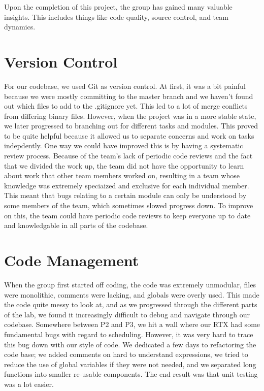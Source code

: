\documentclass[12pt]{report}
\begin{document}
Upon the completion of this project, the group has gained many valuable insights. This includes things like code quality, source control, and team dynamics.

\section{Version Control}
For our codebase, we used Git as version control. At first, it was a bit painful because we were mostly committing to the master branch and we haven't found out which files to add to the .gitignore yet. This led to a lot of merge conflicts from differing binary files.
However, when the project was in a more stable state, we later progressed to branching out for different tasks and modules. This proved to be quite helpful because it allowed us to separate concerns and work on tasks indepdently.
One way we could have improved this is by having a systematic review process. Because of the team's lack of periodic code reviews and the fact that we divided the work up, the team did not have the opportunity to learn about work that other team members worked on, resulting in a team whose knowledge was extremely speciaized and exclusive for each individual member. This meant that bugs relating to a certain module can only be understood by some members of the team, which sometimes slowed progress down. To improve on this, the team could have periodic code reviews to keep everyone up to date and knowledgable in all parts of the codebase.

\section{Code Management}
When the group first started off coding, the code was extremely unmodular, files were monolithic, comments were lacking, and globals were overly used. This made the code quite messy to look at, and as we progressed through the different parts of the lab, we found it increasingly difficult to debug and navigate through our codebase. Somewhere between P2 and P3, we hit a wall where our RTX had some fundamental bugs with regard to scheduling. However, it was very hard to trace this bug down with our style of code. We dedicated a few days to refactoring the code base; we added comments on hard to understand expressions, we tried to reduce the use of global variables if they were not needed, and we separated long functions into smaller re-usable components. The end result was that unit testing was a lot easier.
\end{document}
